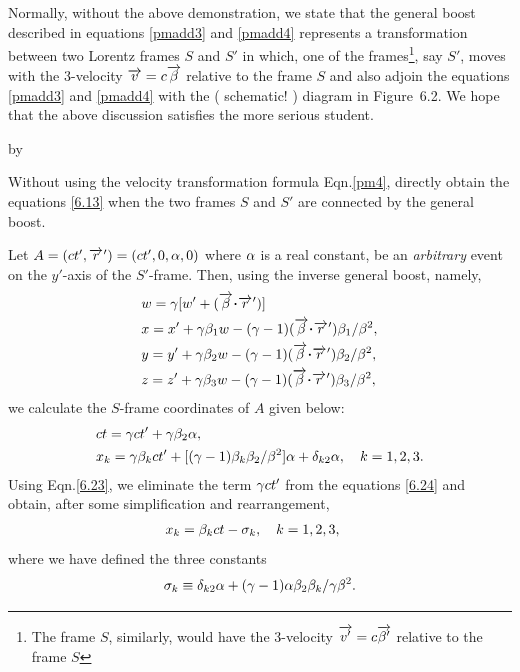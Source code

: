 Normally, without the above demonstration, we  state 
that 
the general boost described in equations \eqref{pmadd3} 
and 
\eqref{pmadd4} represents a transformation between two 
Lorentz  frames $S$ and $S'$ in which, one of the 
frames\footnote{The frame $S$, similarly, would have 
the 
3-velocity $\overrightarrow{v'}=c\overrightarrow{{\beta}'}$ relative to the 
frame 
$S$}, 
say $S'$, moves with the 3-velocity 
$\overrightarrow{v}=c\overrightarrow{{\beta}}$ 
relative to the frame $S$ and also adjoin the 
equations 
\eqref{pmadd3} and \eqref{pmadd4} with the ( schematic! 
) 
diagram in Figure~6.2.  We hope that the above 
discussion 
satisfies  the more serious student.

by 

\exm Without using the velocity transformation formula 
Eqn.\eqref{pm4}, directly obtain the equations 
\eqref{6.13} 
 when the two frames $S$ and $S'$ are connected by the 
general boost. 

\soln Let $A=(ct', {\overrightarrow{r}\hspace*{.3pt}'})=(ct', 0, {\alpha},0)$ where 
${\alpha}$ 
is a real constant, be an \textsl{arbitrary} event on 
the 
$y'$-axis of the $S'$-frame. Then, using the inverse 
general boost, namely,
\begin{align}
&w=\gkg[w'+(\veca{\gkb}\dotp \pvec{r})]\notag\\
& x=x'+\gkg\gkb_1 w -(\gkg-1)(\veca{\gkb}\dotp
\pvec{r})\gkb_1/\gkb^2,\notag\\
& y=y'+\gkg\gkb_2 w -(\gkg-1)(\veca{\gkb}\dotp
\pvec{r})\gkb_2/\gkb^2,\\
& z=z'+\gkg\gkb_3 w -(\gkg-1)(\veca{\gkb}\dotp
\pvec{r})\gkb_3/\gkb^2,\notag
\end{align}
we calculate the $S$-frame coordinates of $A$ given 
below: 
\begin{align}\label{6.23}
&ct= {\gamma} ct'  +{\gamma}{\beta}_2 {\alpha},\\\label{6.24}
&x_k={\gamma} {\beta}_k  ct' +[({\gamma}-1) {\beta}_k 
{\beta}_2/{\beta}^2]{\alpha}
+\delta_{k2}{\alpha},\quad k=1,2,3.
\end{align}
Using Eqn.\eqref{6.23}, we  eliminate the term ${\gamma} 
ct'$ 
from the  equations \eqref{6.24} and obtain, after 
some 
simplification and rearrangement,
\begin{align}\label{6.25}
x_k&={\beta}_k ct- {\sigma}_k,\quad k=1,2,3,
\end{align}
where we have defined the three constants 
\begin{align}\label{6.26}
 {\sigma}_k\equiv  \delta_{k2}
{\alpha}+({\gamma}-1){\alpha}{\beta}_2{\beta}_k/{\gamma}{\beta}^2.
\end{align}\ebx

